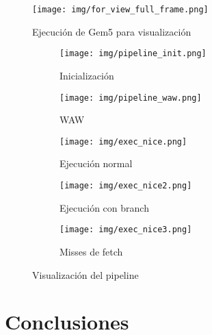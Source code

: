 \documentclass {article}
\begin{document}
\begin{figure}[ht]
  \centering
  \texttt{[image: img/for\_view\_full\_frame.png]}
  \caption{\label{fig:exec_for_viz} Ejecución de Gem5 para visualización}
\end{figure}

\begin{figure}[h]
  \centering
  \label{fig:result_viz}
  \begin{subfigure}[b]{0.9\textwidth}
    \texttt{[image: img/pipeline\_init.png]}
    \caption{\label{fig:pipeline_init} Inicialización}
  \end{subfigure}
  
  \begin{subfigure}[b]{0.9\textwidth}
    \texttt{[image: img/pipeline\_waw.png]}
    \caption{\label{fig:pipeline_waw} WAW}
  \end{subfigure}
  \hfill
  
  \begin{subfigure}[b]{0.9\textwidth}
    \texttt{[image: img/exec\_nice.png]}
    \caption{\label{fig:viz} Ejecución normal}
  \end{subfigure}
  
  \begin{subfigure}[b]{0.9\textwidth}
    \texttt{[image: img/exec\_nice2.png]}
    \caption{\label{fig:viz2} Ejecución con branch}
  \end{subfigure}
  
  \begin{subfigure}[b]{0.9\textwidth}
    \texttt{[image: img/exec\_nice3.png]}
    \caption{\label{fig:viz3} Misses de fetch}
  \end{subfigure}
  \caption{Visualización del pipeline}
\end{figure}





\section{Conclusiones}





\end{document}
